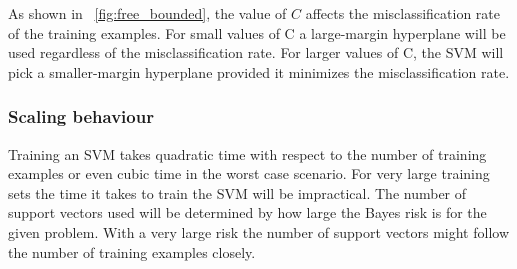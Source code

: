 \documentclass[a4paper]{article}
\begin{document}
As shown in ~\ref{fig:free_bounded}, the value of $C$ affects the misclassification rate of the training examples. For small values of C a large-margin hyperplane will be used regardless of the misclassification rate. For larger values of C, the SVM will pick a smaller-margin hyperplane provided it minimizes the misclassification rate. 

\subsubsection{Scaling behaviour}
Training an SVM takes quadratic time with respect to the number of training examples or even cubic time in the worst case scenario. For very large training sets the time it takes to train the SVM will be impractical. The number of support vectors used will be determined by how large the Bayes risk is for the given problem. With a very large risk the number of support vectors might follow the number of training examples closely.
\end{document}

